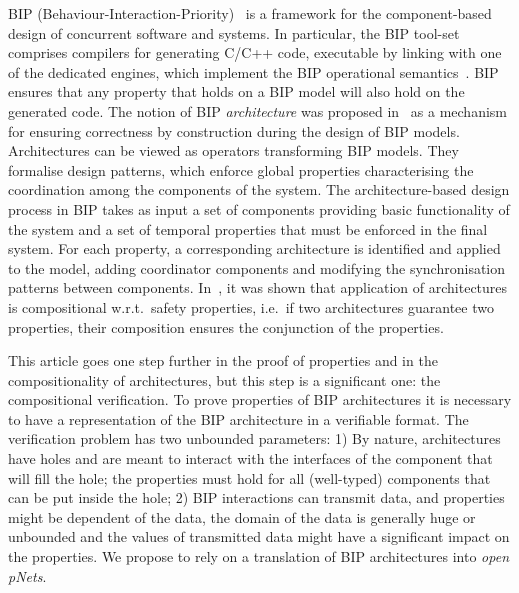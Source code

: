 \documentclass{llncs}
\newcommand{\ie}[1][\ ]{i.e.#1}
\newcommand{\eg}[1][\ ]{e.g.#1}
\newcommand{\wrt}[1][\ ]{w.r.t.#1}
\begin{document}
BIP (Behaviour-Interaction-Priority)~\cite{bip} is a framework for the
component-based design of concurrent software and systems.  In
particular, the BIP tool-set comprises compilers for generating C/C++
code, executable by linking with one of the dedicated engines, which
implement the BIP operational semantics~\cite{BliSif08-acp-tc}.
BIP ensures that any property that holds on a BIP
model will also hold on the generated code.
The notion of BIP \emph{architecture} was proposed
in~\cite{AttieBBJS16-architectures-faoc} as a mechanism for ensuring
correctness by construction during the design of BIP models.
Architectures can be viewed as operators transforming BIP models.
They formalise design patterns, which enforce global properties
characterising the coordination among the components of the system.
The architecture-based design process in BIP takes as input a set of
components providing basic functionality of the system and a set of
temporal properties that must be enforced in the final system.  For
each property, a corresponding architecture is identified
and applied to the model, adding
coordinator components and modifying the 
synchronisation patterns between components.
In~\cite{AttieBBJS16-architectures-faoc}, it was shown that
application of architectures is compositional \wrt safety properties,
\ie if two architectures guarantee two properties, their composition ensures the conjunction of the properties.
%

This article goes one step further in the proof of properties and in the compositionality of architectures, but this step is a significant one: the compositional verification. To prove properties of BIP architectures
it is necessary to have a representation of the BIP architecture in a verifiable format. 
The verification problem has two unbounded parameters: 1) By nature, architectures have holes and are meant to interact with the interfaces of the component that will fill the hole; the properties must hold for all (well-typed) components that can be put inside the hole; 2) BIP interactions can transmit data, and properties might be dependent of the data, the domain of the data is generally huge or unbounded and the values of transmitted data might have a significant impact on the properties.
We propose to rely on a translation of BIP architectures into \emph{open pNets}.  
\end{document}
